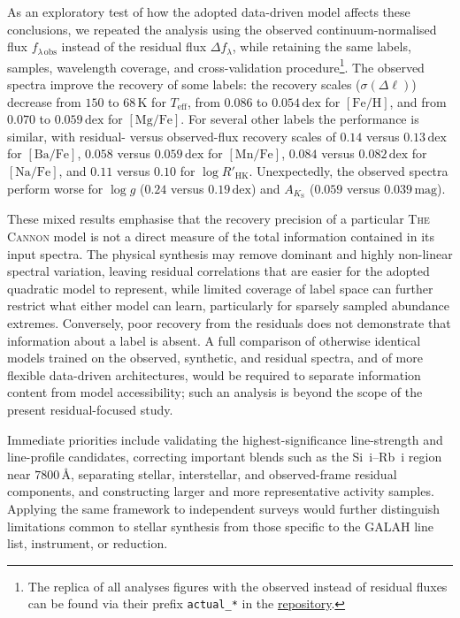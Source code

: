 \documentclass[twocolumn,apj,numberedappendix,appendixfloats]{openjournal}
\begin{document}
As an exploratory test of how the adopted data-driven model affects these conclusions, we repeated the analysis using the observed continuum-normalised flux $f_{\lambda\,\mathrm{obs}}$ instead of the residual flux $\Delta f_\lambda$, while retaining the same labels, samples, wavelength coverage, and cross-validation procedure\footnote{The replica of all analyses figures with the observed instead of residual fluxes can be found via their prefix \texttt{actual\_*} in the \href{https://github.com/svenbuder/residual_cannon}{repository}.}. The observed spectra improve the recovery of some labels: the recovery scales ($\sigma(\Delta \ell)$) decrease from $150$ to $68\,\mathrm{K}$ for $T_\mathrm{eff}$, from $0.086$ to $0.054\,\mathrm{dex}$ for $[\mathrm{Fe/H}]$, and from $0.070$ to $0.059\,\mathrm{dex}$ for $[\mathrm{Mg/Fe}]$. For several other labels the performance is similar, with residual- versus observed-flux recovery scales of $0.14$ versus $0.13\,\mathrm{dex}$ for $[\mathrm{Ba/Fe}]$, $0.058$ versus $0.059\,\mathrm{dex}$ for $[\mathrm{Mn/Fe}]$, $0.084$ versus $0.082\,\mathrm{dex}$ for $[\mathrm{Na/Fe}]$, and $0.11$ versus $0.10$ for $\log R'_\mathrm{HK}$. Unexpectedly, the observed spectra perform worse for $\log g$ ($0.24$ versus $0.19\,\mathrm{dex}$) and $A_{K_\mathrm{S}}$ ($0.059$ versus $0.039\,\mathrm{mag}$).

These mixed results emphasise that the recovery precision of a particular \textsc{The Cannon} model is not a direct measure of the total information contained in its input spectra. The physical synthesis may remove dominant and highly non-linear spectral variation, leaving residual correlations that are easier for the adopted quadratic model to represent, while limited coverage of label space can further restrict what either model can learn, particularly for sparsely sampled abundance extremes. Conversely, poor recovery from the residuals does not demonstrate that information about a label is absent. A full comparison of otherwise identical models trained on the observed, synthetic, and residual spectra, and of more flexible data-driven architectures, would be required to separate information content from model accessibility; such an analysis is beyond the scope of the present residual-focused study.

Immediate priorities include validating the highest-significance line-strength and line-profile candidates, correcting important blends such as the Si~{\sc i}--Rb~{\sc i} region near $7800\,\text{\AA}$, separating stellar, interstellar, and observed-frame residual components, and constructing larger and more representative activity samples. Applying the same framework to independent surveys would further distinguish limitations common to stellar synthesis from those specific to the GALAH line list, instrument, or reduction.
\end{document}

